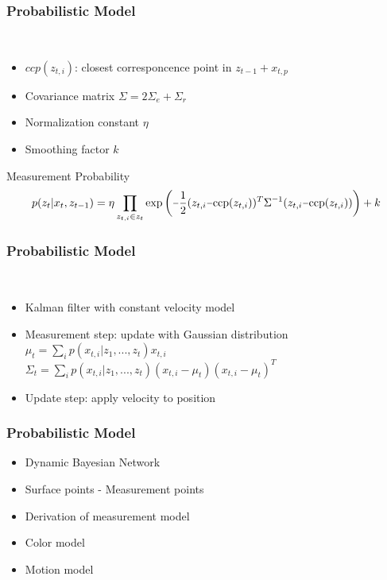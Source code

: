 \begin{frame}
  \frametitle{Probabilistic Model}
  \begin{description}[]
  \item[Measurement Model Computation] \hfill \\
  \begin{itemize}
  \item $ccp(z_{t,i})$: closest corresponcence point in $z_{t-1}+x_{t,p}$
  \pause
  \item Covariance matrix $\Sigma = 2\Sigma_e+\Sigma_r$
  \pause
  \item Normalization constant $\eta$
  \item Smoothing factor $k$
  \end{itemize}
  \end{description}     
  \begin{block}{Measurement Probability}
  \small
  $$
  p(z_t|x_t,z_{t-1}) =
  \eta\prod\limits_{z_{t,i}\in z_t}
  \mathrm{exp}\left(\unaryminus\frac{1}{2}(z_{t,i}\unaryminus\mathrm{ccp}(z_{t,i}))^T\Sigma^{\unaryminus 1}(z_{t,i}\unaryminus\mathrm{ccp}(z_{t,i}))\right)+k
  \nonumber
  $$
  \end{block}
\end{frame}

\begin{frame}
  \frametitle{Probabilistic Model}
  \begin{description}[]
  \item[Motion Model] \hfill \\
  \begin{itemize}
  \item Kalman filter with constant velocity model
  \item Measurement step: update with Gaussian distribution\\
        $\mu_t=\sum_i p(x_{t,i}|z_1,...,z_t)x_{t,i}$\\
        $\Sigma_t=\sum_i p(x_{t,i}|z_1,...,z_t) (x_{t,i}-\mu_t)(x_{t,i}-\mu_t)^T$
  \item Update step: apply velocity to position
  \end{itemize}
  \end{description}
\end{frame}

\begin{frame}
  \frametitle{Probabilistic Model}
  \begin{itemize}
  \item Dynamic Bayesian Network
  \item Surface points - Measurement points
  \item Derivation of measurement model
  \item Color model
  \item Motion model
  \end{itemize}
\end{frame}


